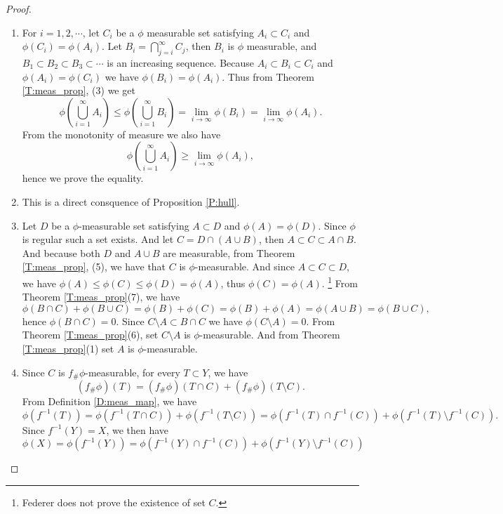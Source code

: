 \begin{proof}
\begin{enumerate}
  \item For $i=1,2,\cdots$, let $C_i$ be a $\phi$ measurable set satisfying 
    $A_i\subset C_i$ and $\phi(C_i)=\phi(A_i)$. Let
    $B_i=\bigcap_{j=i}^{\infty} C_j$, then $B_i$ is $\phi$ measurable, and 
    $B_1\subset B_2\subset B_3\subset\cdots$ is an increasing sequence. 
    Because $A_i\subset B_i\subset C_i$ and $\phi(A_i)=\phi(C_i)$ we have
    $\phi(B_i)=\phi(A_i)$. Thus from Theorem \ref{T:meas_prop}, (3) we get
    \[
      \phi\left( \bigcup_{i=1}^{\infty} A_i \right)
        \le \phi\left( \bigcup_{i=1}^{\infty} B_i \right)
        = \lim_{i\to\infty} \phi(B_i)
        = \lim_{i\to\infty} \phi(A_i).
    \]
    From the monotonity of measure we also have 
    \[
      \phi\left( \bigcup_{i=1}^{\infty} A_i\right) 
        \ge \lim_{i\to\infty} \phi(A_i),
    \]
    hence we prove the equality.
  \item This is a direct consquence of Proposition \ref{P:hull}.
  \item Let $D$ be a $\phi$-measurable set satisfying $A\subset D$ and 
    $\phi(A)=\phi(D)$. Since $\phi$ is regular such a set exists. 
    And let $C=D\cap (A\cup B)$, then $A\subset C\subset A\cap B$. 
    And because both $D$ and $A\cup B$ are measurable, from Theorem 
    \ref{T:meas_prop}, (5), we have that $C$ is $\phi$-measurable.
    And since $A\subset C\subset D$, we have 
    $\phi(A)\le \phi(C)\le \phi(D)=\phi(A)$, thus $\phi(C)=\phi(A)$.
    \footnote{Federer does not prove the existence of set $C$.}
    From Theorem \ref{T:meas_prop}(7), we have
    \[
      \phi(B\cap C)+\phi(B\cup C)=\phi(B)+\phi(C)=\phi(B)+\phi(A)
        =\phi(A\cup B)=\phi(B\cup C),
    \]
    hence $\phi(B\cap C)=0$. Since $C\setminus A\subset B\cap C$ 
    we have $\phi(C\setminus A)=0$. From Theorem \ref{T:meas_prop}(6), set
    $C\setminus A$ is $\phi$-measurable. And from Theorem \ref{T:meas_prop}(1)
    set $A$ is $\phi$-measurable. 
  \item Since $C$ is $f_\#\phi$-measurable, for every $T\subset Y$, we have
    \[
      (f_\#\phi)(T) = (f_\#\phi)(T\cap C) + (f_\#\phi)(T\setminus C).
    \]
    From Definition \ref{D:meas_map}, we have
    \[
      \phi(f^{-1}(T)) = \phi(f^{-1}(T\cap C)) + \phi(f^{-1}(T\setminus C))
      = \phi(f^{-1}(T)\cap f^{-1}(C)) + \phi(f^{-1}(T)\setminus f^{-1}(C)).
    \]
    Since $f^{-1}(Y)=X$, we then have
    \[
      \phi(X)=\phi(f^{-1}(Y)) 
      = \phi(f^{-1}(Y)\cap f^{-1}(C)) + \phi(f^{-1}(Y)\setminus f^{-1}(C))
\]
\end{enumerate}
\end{proof}
